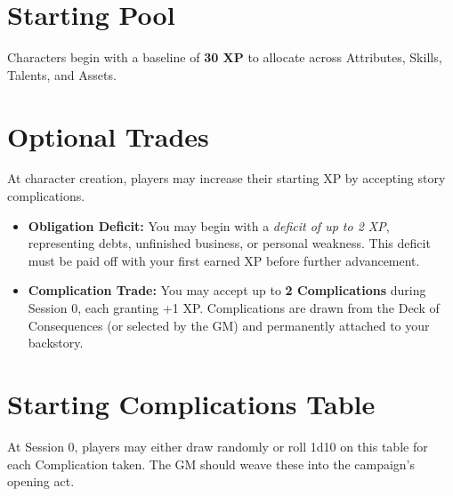 \documentclass[12pt]{article}
\begin{document}
\section{Starting Pool}
Characters begin with a baseline of \textbf{30 XP} to allocate across Attributes, Skills, Talents, and Assets.

\section{Optional Trades}
At character creation, players may increase their starting XP by accepting story complications.  

\begin{itemize}
  \item \textbf{Obligation Deficit:} You may begin with a \emph{deficit of up to 2 XP}, representing debts, unfinished business, or personal weakness. This deficit must be paid off with your first earned XP before further advancement.  
  \item \textbf{Complication Trade:} You may accept up to \textbf{2 Complications} during Session 0, each granting +1 XP. Complications are drawn from the Deck of Consequences (or selected by the GM) and permanently attached to your backstory.  
\end{itemize}

\section{Starting Complications Table}
At Session 0, players may either draw randomly or roll 1d10 on this table for each Complication taken. The GM should weave these into the campaign’s opening act.
\end{document}
